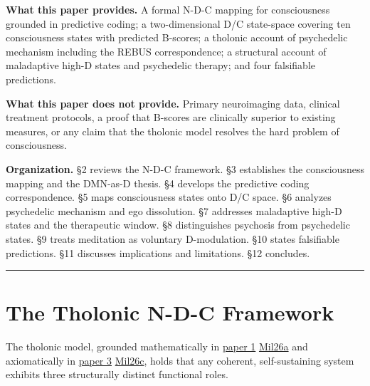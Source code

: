 \documentclass[12pt]{article}
\begin{document}
\textbf{What this paper provides.} A formal N-D-C mapping for
consciousness grounded in predictive coding; a two-dimensional D/C
state-space covering ten consciousness states with predicted B-scores; a
tholonic account of psychedelic mechanism including the REBUS
correspondence; a structural account of maladaptive high-D states and
psychedelic therapy; and four falsifiable predictions.

\textbf{What this paper does not provide.} Primary neuroimaging data,
clinical treatment protocols, a proof that B-scores are clinically
superior to existing measures, or any claim that the tholonic model
resolves the hard problem of consciousness.

\textbf{Organization.} §2 reviews the N-D-C framework. §3 establishes
the consciousness mapping and the DMN-as-D thesis. §4 develops the
predictive coding correspondence. §5 maps consciousness states onto D/C
space. §6 analyzes psychedelic mechanism and ego dissolution. §7
addresses maladaptive high-D states and the therapeutic window. §8
distinguishes psychosis from psychedelic states. §9 treats meditation as
voluntary D-modulation. §10 states falsifiable predictions. §11
discusses implications and limitations. §12 concludes.

\begin{center}\rule{0.5\linewidth}{0.5pt}\end{center}

\section{The Tholonic N-D-C Framework}\label{the-tholonic-n-d-c-framework}

The tholonic model, grounded mathematically in
\href{https://github.com/baardev/truevalue/blob/main/docnav/Research/papers/1_recursive-tholonic-five-constants/1_recursive-tholonic-five-constants.pdf}{paper
1}
\href{https://github.com/baardev/truevalue/blob/main/docnav/Research/papers/1_recursive-tholonic-five-constants/1_recursive-tholonic-five-constants.pdf}{Mil26a}
and axiomatically in
\href{https://github.com/baardev/truevalue/blob/main/docnav/Research/papers/3_minimal-recursive-triadic-framework/3_minimal-recursive-triadic-framework.pdf}{paper
3}
\href{https://github.com/baardev/truevalue/blob/main/docnav/Research/papers/3_minimal-recursive-triadic-framework/3_minimal-recursive-triadic-framework.pdf}{Mil26c},
holds that any coherent, self-sustaining system exhibits three
structurally distinct functional roles.
\end{document}
